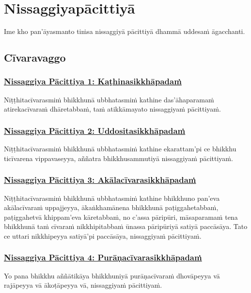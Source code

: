 \section{Nissaggiyapācittiyā}
\label{np}

\begin{intro}
  Ime kho pan'āyasmanto tiṁsa nissaggiyā pācittiyā dhammā uddesaṁ āgacchanti.
\end{intro}

\setsubsecheadstyle{\subsectionFmt}
\subsection{Cīvaravaggo}
\vspace{0.2cm}

\subsubsection*{\hyperref[forf-exp1]{Nissaggiya Pācittiya 1: Kaṭhinasikkhāpadaṁ}}
\label{np1}
Niṭṭhitacīvarasmiṁ bhikkhunā ubbhatasmiṁ kathine das'āhaparamaṁ atirekacīvaraṁ dhāretabbaṁ, taṁ atikkāmayato nissaggiyaṁ pācittiyaṁ.

\subsubsection*{\hyperref[forf-exp2]{Nissaggiya Pācittiya 2: Uddositasikkhāpadaṁ}}
\label{np2}
Niṭṭhitacīvarasmiṁ bhikkhunā ubbhatasmiṁ kathine ekarattam'pi ce bhikkhu ticīvarena vippavaseyya, aññatra bhikkhusammutiyā nissaggiyaṁ pācittiyaṁ.

\subsubsection*{\hyperref[forf-exp3]{Nissaggiya Pācittiya 3: Akālacīvarasikkhāpadaṁ}}
\label{np3}
Niṭṭhitacīvarasmiṁ bhikkhunā ubbhatasmiṁ kathine bhikkhuno pan'eva akālacīvaraṁ uppajjeyya, ākaṅkhamānena bhikkhunā paṭiggahetabbaṁ, paṭiggahetvā khippam'eva kāretabbaṁ, no c'assa pāripūri, māsaparamaṁ tena bhikkhunā taṁ cīvaraṁ nikkhipitabbaṁ ūnassa pāripūriyā satiyā paccāsāya. Tato ce uttari nikkhipeyya satiyā'pi paccāsāya, nissaggiyaṁ pācittiyaṁ.

\subsubsection*{\hyperref[forf-exp4]{Nissaggiya Pācittiya 4: Purāṇacīvarasikkhāpadaṁ}}
\label{np4}
Yo pana bhikkhu aññātikāya bhikkhuniyā purāṇacīvaraṁ dhovāpeyya vā rajāpeyya vā ākoṭāpeyya vā, nissaggiyaṁ pācittiyaṁ.

